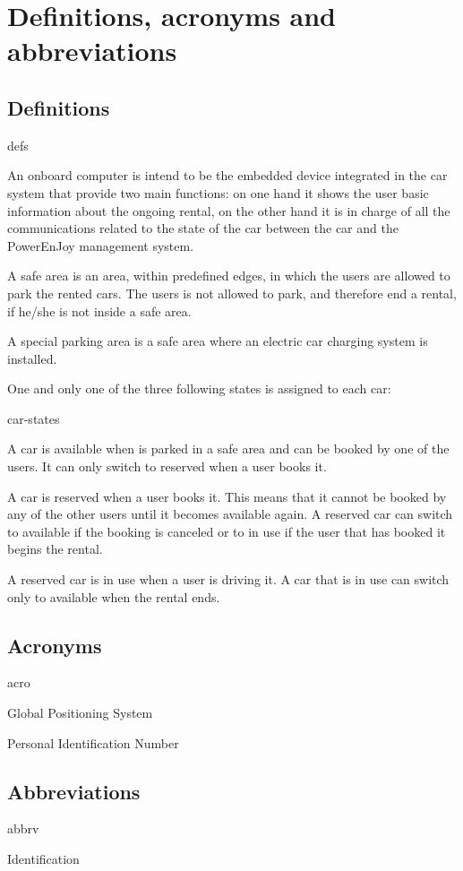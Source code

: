 \section{Definitions, acronyms and abbreviations}

\subsection{Definitions}
	\begin{labeling}{defs}
		\item[\textbf{Onboard computer}] An onboard computer is intend to be the embedded device integrated in the car system that provide two main functions: on one hand it shows the user basic information about the ongoing rental, on the other hand it is in charge of all the communications related to the state of the car between the car and the PowerEnJoy management system.
		\item[\textbf{Safe area}] A safe area is an area, within predefined edges, in which the users are allowed to park the rented cars. The users is not allowed to park, and therefore end a rental, if he/she is not inside a safe area.
		\item[\textbf{Special parking area}] A special parking area is a safe area where an electric car charging system is installed.
		\item[\textbf{Car states}] One and only one of the three following states is assigned to each car:
			\begin{labeling}{car-states}
				\item[\textbf{Available}] A car is available when is parked in a safe area and can be booked by one of the users. It can only switch to reserved when a user books it.
				\item[\textbf{Reserved}] A car is reserved when a user books it. This means that it cannot be booked by any of the other users until it becomes available again. A reserved car can switch to available if the booking is canceled or to in use if the user that has booked it begins the rental.
				\item[\textbf{In use}] A reserved car is in use when a user is driving it. A car that is in use can switch only to available when the rental ends.
				
			\end{labeling}

	\end{labeling}

\subsection{Acronyms}
	\begin{labeling}{acro}
		\item[\textbf{GPS}] Global Positioning System
		\item[\textbf{PIN}] Personal Identification Number
	\end{labeling}

\subsection{Abbreviations}
	\begin{labeling}{abbrv}
		\item[\textbf{ID}] Identification
	\end{labeling}
